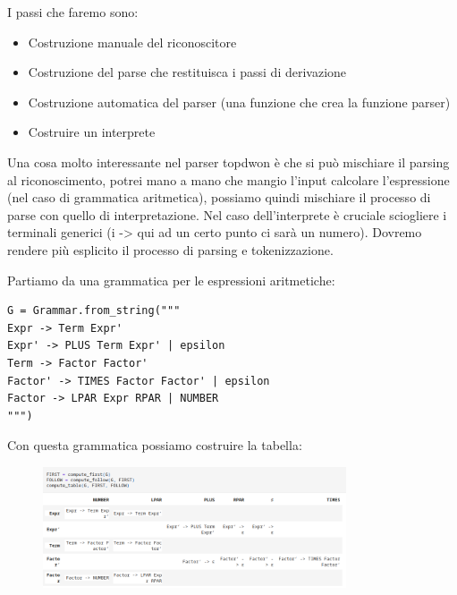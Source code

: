 I passi che faremo sono:
\begin{itemize}
  \item Costruzione manuale del riconoscitore
  \item Costruzione del parse che restituisca i passi di derivazione
  \item Costruzione automatica del parser (una funzione che crea la funzione parser)
  \item Costruire un interprete
\end{itemize}

Una cosa molto interessante nel parser topdwon è che si può mischiare il parsing al riconoscimento, potrei mano a mano che mangio l'input calcolare l'espressione (nel caso di grammatica aritmetica), possiamo quindi mischiare il processo di parse con quello di interpretazione. Nel caso dell'interprete è cruciale sciogliere i terminali generici (i -> qui ad un certo punto ci sarà un numero). Dovremo rendere più esplicito il processo di parsing e tokenizzazione.

Partiamo da una grammatica per le espressioni aritmetiche:
\begin{lstlisting}
G = Grammar.from_string("""
Expr -> Term Expr'
Expr' -> PLUS Term Expr' | epsilon
Term -> Factor Factor'
Factor' -> TIMES Factor Factor' | epsilon
Factor -> LPAR Expr RPAR | NUMBER
""")
\end{lstlisting}

Con questa grammatica possiamo costruire la tabella:
\begin{figure}[ht!]
  \centering
  \includegraphics[width=0.8\textwidth]{images/Parsing/TABLE_parsing_ricorsivo_discendente.png}
\end{figure}

